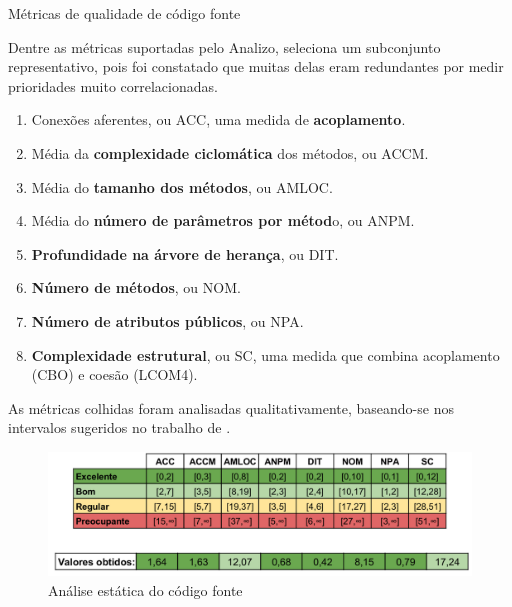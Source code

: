 \begin{frame}[allowframebreaks]{Métricas de qualidade de código fonte}

Dentre as métricas suportadas pelo Analizo,  seleciona um subconjunto representativo, pois foi constatado que muitas delas eram redundantes por medir prioridades muito correlacionadas.
\linebreak
\linebreak
\begin{enumerate}
\item Conexões aferentes, ou ACC, uma medida de \textbf{acoplamento}.
\linebreak
\item Média da \textbf{complexidade ciclomática} dos métodos, ou ACCM.
\linebreak
\item Média do \textbf{tamanho dos métodos}, ou AMLOC.
\linebreak
\item Média do \textbf{número de parâmetros por métod}o, ou ANPM.

\newpage

\item \textbf{Profundidade na árvore de herança}, ou DIT.
\linebreak
\item \textbf{Número de métodos}, ou NOM.
\linebreak
\item \textbf{Número de atributos públicos}, ou NPA.
\linebreak
\item \textbf{Complexidade estrutural}, ou SC, uma medida que combina acoplamento (CBO) e coesão (LCOM4).
\end{enumerate}

\newpage

As métricas colhidas foram analisadas qualitativamente, baseando-se nos intervalos sugeridos no trabalho de .
\linebreak
  \begin{figure}[t]
    \centering
    \includegraphics[height=\dimexpr7\textheight/14\relax]{figuras/Analise_estatica}
    \caption{Análise estática do código fonte}
  \end{figure}
\end{frame}

